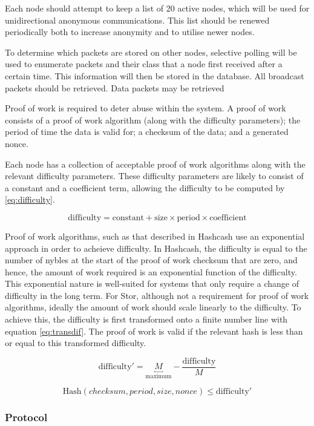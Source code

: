 			Each node should attempt to keep a list of 20 active nodes, which will be used for unidirectional anonymous communications. This list should be renewed periodically both to increase anonymity and to utilise newer nodes.
			
			To determine which packets are stored on other nodes, selective polling will be used to enumerate packets and their class that a node first received after a certain time. This information will then be stored in the database. All broadcast packets should be retrieved. Data packets may be retrieved
			
			
			
			Proof of work is required to deter abuse within the system. A proof of work consists of a proof of work algorithm (along with the difficulty parameters); the period of time the data is valid for; a checksum of the data; and a generated nonce.
			
			Each node has a collection of acceptable proof of work algorithms along with the relevant difficulty parameters. These difficulty parameters are likely to consist of a constant and a coefficient term, allowing the difficulty to be computed by \ref{eq:difficulty}. 
			
			\begin{equation} \label{eq:difficulty}
				\text{difficulty} = \text{constant} + \text{size} \times \text{period} \times \text{coefficient}
			\end{equation}
			
			Proof of work algorithms, such as that described in Hashcash use an exponential approach in order to acheieve difficulty. In Hashcash, the difficulty is equal to the number of nybles at the start of the proof of work checksum that are zero, and hence, the amount of work required is an exponential function of the difficulty. This exponential nature is well-suited for systems that only require a change of difficulty in the long term. For Stor, although not a requirement for proof of work algorithms, ideally the amount of work should scale linearly to the difficulty. To achieve this, the difficulty is first transformed onto a finite number line with equation \ref{eq:transdif}. The proof of work is valid if the relevant hash is less than or equal to this transformed difficulty.
			
			
			\begin{equation} \label{eq:transdif}
				\text{difficulty}' = \underbracket{M}_\text{maximum} - \frac{\text{difficulty}}{M}
			\end{equation}
			
			\begin{equation}
				\text{Hash}(checksum, period, size, nonce) \le \text{difficulty}'
			\end{equation}
			
			
			
			
		\subsubsection{Protocol}
			
			
			
			